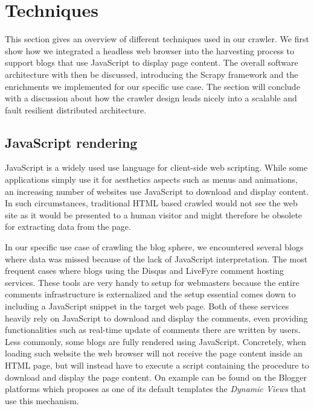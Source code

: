 \section{Techniques}

This section gives an overview of different techniques used in our crawler. We first show how we integrated a headless web browser into the harvesting process to support blogs that use JavaScript to display page content. The overall software architecture with then be discussed, introducing the Scrapy framework and the enrichments we implemented for our specific use case. The section will conclude with a discussion about how the crawler design leads nicely into a scalable and fault resilient distributed architecture.


\subsection{JavaScript rendering}
%
JavaScript is a widely used use language for client-side web scripting. While some applications simply use it for aesthetics aspects such as menus and animations, an increasing number of websites use JavaScript to download and display content. In such circumstances, traditional HTML based crawled would not see the web site as it would be presented to a human visitor and might therefore be obsolete for extracting data from the page.

%
In our specific use case of crawling the blog sphere, we encountered several blogs where data was missed because of the lack of JavaScript interpretation. The most frequent cases where blogs using the Disqus\cite{disqus2013} and LiveFyre\cite{livefyre2013} comment hosting services. These tools are very handy to setup for webmasters because the entire comments infrastructure is externalized and the setup essential comes down to including a JavaScript snippet in the target web page. Both of these services heavily rely on JavaScript to download and display the comments, even providing functionalities such as real-time update of comments there are written by users. Less commonly, some blogs are fully rendered using JavaScript. Concretely, when loading such website the web browser will not receive the page content inside an HTML page, but will instead have to execute a script containing the procedure to download and display the page content. On example can be found on the Blogger platforms which proposes as one of its default templates the \emph{Dynamic Views} \cite{antinharasymiv2011} that use this mechanism.

